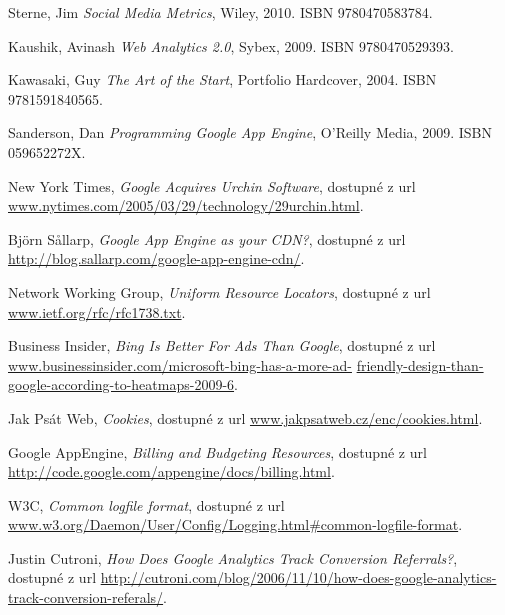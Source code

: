 \documentclass[bc,male,java,dept456]{diploma}						%
\begin{document}
\begin{thebibliography}{99}


 Sterne, Jim
\textit{Social Media Metrics}, Wiley, 2010. ISBN 9780470583784.

 Kaushik, Avinash
\textit{Web Analytics 2.0}, Sybex, 2009. ISBN 9780470529393.

 Kawasaki, Guy
\textit{The Art of the Start}, Portfolio Hardcover, 2004. ISBN 9781591840565.

 Sanderson, Dan
\textit{Programming Google App Engine}, O'Reilly Media, 2009. ISBN 059652272X.



 New York Times,
\textit{Google Acquires Urchin Software}, dostupné z url \url{www.nytimes.com/2005/03/29/technology/29urchin.html}.

 Björn Sållarp,
\textit{Google App Engine as your CDN?}, dostupné z url \url{http://blog.sallarp.com/google-app-engine-cdn/}.

 Network Working Group,
\textit{Uniform Resource Locators}, dostupné z url \url{www.ietf.org/rfc/rfc1738.txt}.

 Business Insider,
\textit{Bing Is Better For Ads Than Google}, dostupné z url \url{www.businessinsider.com/microsoft-bing-has-a-more-ad-} \url{friendly-design-than-google-according-to-heatmaps-2009-6}.

 Jak Psát Web,
\textit{Cookies}, dostupné z url \url{www.jakpsatweb.cz/enc/cookies.html}.

 Google AppEngine,
\textit{Billing and Budgeting Resources}, dostupné z url \url{http://code.google.com/appengine/docs/billing.html}.

 W3C,
\textit{Common logfile format}, dostupné z url \url{www.w3.org/Daemon/User/Config/Logging.html#common-logfile-format}.

 Justin Cutroni,
\textit{How Does Google Analytics Track Conversion Referrals?}, dostupné z url \url{http://cutroni.com/blog/2006/11/10/how-does-google-analytics-track-conversion-referals/}.

\end{thebibliography}


\end{document}

